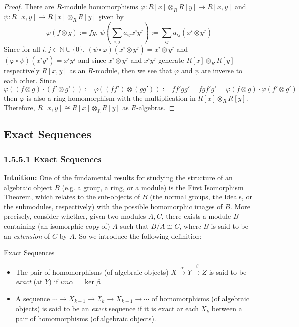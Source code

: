 \begin{proof}
    There are $R$-module homomorphisms $\varphi: R[x] \otimes_R R[y] \to R[x,y]$ and $\psi: R[x,y] \to R[x] \otimes_R R[y]$ given by
    $$\varphi (f \otimes g) := fg, \;\psi (\sum_{i,j} a_{ij} x^iy^j) := \sum_{ij} a_{ij} (x^i \otimes y^j)$$
    Since for all $i,j \in \mathbb{N} \cup \{0\}$, $(\psi \circ \varphi )(x^i \otimes y^j) = x^i \otimes y^j$ and $(\varphi \circ \psi) (x^iy^j) =x^iy^j$ and since $x^i \otimes y^j$ and $x^iy^j$ generate $R[x] \otimes_R R[y]$ respectively $R[x,y]$ as an $R$-module, then we see that $\varphi$ and $\psi$ are inverse to each other. Since
    $$\varphi ((f \otimes g) \cdot (f' \otimes g')) := \varphi ((ff') \otimes (gg')) := ff'gg' =fgf'g' = \varphi(f\otimes g) \cdot \varphi (f' \otimes g')$$
    then $\varphi$ is also a ring homomorphism with the multiplication in $R[x] \otimes_R R[y]$. Therefore, $R[x,y] \cong R[x] \otimes_R R[y]$ as $R$-algebras.
\end{proof}


\subsection{Exact Sequences}

\subsubsection{1.5.5.1 Exact Sequences}

\noindent\textbf{Intuition:} One of the fundamental results for studying the structure of an algebraic object $B$ (e.g. a group, a ring, or a module) is the First Isomorphism Theorem, which relates to the sub-objects of $B$ (the normal groups, the ideals, or the submodules, respectively) with the possible homomorphic images of $B$. More precisely, consider whether, given two modules $A,C$, there exists a module $B$ containing (an isomorphic copy of) $A$ such that $B/A \cong C$, where $B$ is said to be an \textit{extension} of $C$ by $A$. So we introduce the following definition:

\begin{definition}{Exact Sequences}
\begin{itemize}
    \item The pair of homomorphisms (of algebraic objects) $X \overset{\alpha}{\to} Y \overset{\beta}{\to} Z$ is said to be \textit{exact} (at $Y$) if $im\alpha= \ker \beta$.

    \item A sequence $\cdots \to X_{k-1} \to X_k \to X_{k+1} \to \cdots$ of homomorphisms (of algebraic objects) is said to be an \textit{exact} sequence if it is exact ar each $X_k$ between a pair of homomorphisms (of algebraic objects).
\end{itemize}
\end{definition}

